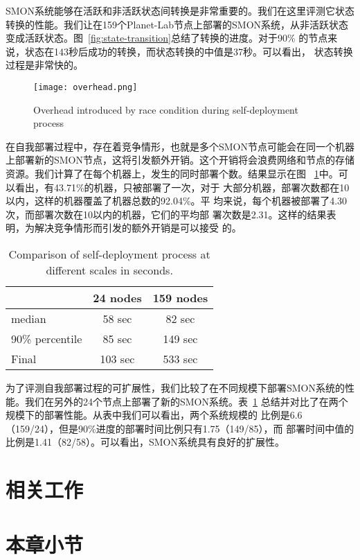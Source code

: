 SMON系统能够在活跃和非活跃状态间转换是非常重要的。我们在这里评测它状态
转换的性能。我们让在159个Planet-Lab节点上部署的SMON系统，从非活跃状态
变成活跃状态。图~\ref{fig:state-transition}总结了转换的进度。对于90\%
的节点来说，状态在143秒后成功的转换，而状态转换的中值是37秒。可以看出，
状态转换过程是非常快的。

\begin{figure}
\centering
  \begin{minipage}{0.8\linewidth}
    \centering
    \texttt{[image: overhead.png]}
    \caption{Overhead introduced by race condition during
    self-deployment process}
    \label{fig:overhead}
  \end{minipage}
\end{figure}

在自我部署过程中，存在着竞争情形，也就是多个SMON节点可能会在同一个机器
上部署新的SMON节点，这将引发额外开销。这个开销将会浪费网络和节点的存储
资源。我们计算了在每个机器上，发生的同时部署个数。结果显示在图~
\ref{fig:overhead}中。可以看出，有43.71\%的机器，只被部署了一次，对于
大部分机器，部署次数都在10以内，这样的机器覆盖了机器总数的92.04\%。平
均来说，每个机器被部署了4.30次，而部署次数在10以内的机器，它们的平均部
署次数是2.31。这样的结果表明，为解决竞争情形而引发的额外开销是可以接受
的。

\begin{table}
\centering
  \begin{minipage}{0.8\linewidth}
    \centering
    \caption{Comparison of self-deployment process at different
    scales in seconds.}
    \label{fig:scalability}
    \begin{tabular}{|l|c|c|}
    \hline
      & 24 nodes & 159 nodes\\
    \hline
    median & 58 sec & 82 sec \\
    \hline
    90\% percentile & 85 sec & 149 sec\\
    \hline
    Final & 103 sec & 533 sec\\
    \hline
    \end{tabular}
  \end{minipage}
\end{table}

为了评测自我部署过程的可扩展性，我们比较了在不同规模下部署SMON系统的性
能。我们在另外的24个节点上部署了新的SMON系统。表~\ref{fig:scalability}
总结并对比了在两个规模下的部署性能。从表中我们可以看出，两个系统规模的
比例是6.6（159/24），但是90\%进度的部署时间比例只有1.75（149/85），而
部署时间中值的比例是1.41（82/58）。可以看出，SMON系统具有良好的扩展性。


\section{相关工作}

\section{本章小节}
